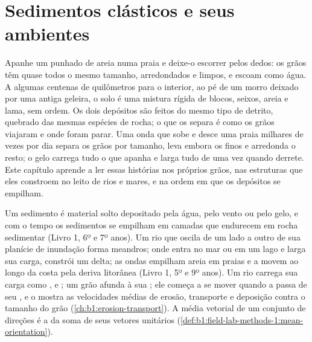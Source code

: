 \chapter{Sedimentos clásticos e seus ambientes}\label{ch:b1:clastic-sediments}

Apanhe um punhado de areia numa praia e deixe-o escorrer pelos dedos: os grãos têm quase todos o mesmo tamanho, arredondados e limpos, e escoam como água. A algumas centenas de quilômetros para o interior, ao pé de um morro deixado por uma antiga geleira, o solo é uma mistura rígida de blocos, seixos, areia e lama, sem ordem. Os dois depósitos são feitos do mesmo tipo de detrito, quebrado das mesmas espécies de rocha; o que os separa é como os grãos viajaram e onde foram parar. Uma onda que sobe e desce uma praia milhares de vezes por dia separa os grãos por tamanho, leva embora os finos e arredonda o resto; o gelo carrega tudo o que apanha e larga tudo de uma vez quando derrete. Este capítulo aprende a ler essas histórias nos próprios grãos, nas estruturas que eles constroem no leito de rios e mares, e na ordem em que os depósitos se empilham.

\begin{recall}
Um sedimento é material solto depositado pela água, pelo vento ou pelo gelo, e com o tempo os sedimentos se empilham em camadas que endurecem em rocha sedimentar (Livro 1, 6º e 7º anos). Um rio que oscila de um lado a outro de sua planície de inundação forma meandros; onde entra no mar ou em um lago e larga sua carga, constrói um delta; as ondas empilham areia em praias e a movem ao longo da costa pela deriva litorânea (Livro 1, 5º e 9º anos). Um rio carrega sua carga como ,  e ; um grão afunda à sua ; ele começa a se mover quando a  passa de seu , e o  mostra as velocidades médias de erosão, transporte e deposição contra o tamanho do grão (\cref{ch:b1:erosion-transport}). A média vetorial de um conjunto de direções é a  da soma de seus vetores unitários (\cref{def:b1:field-lab-methods-1:mean-orientation}).
\end{recall}

